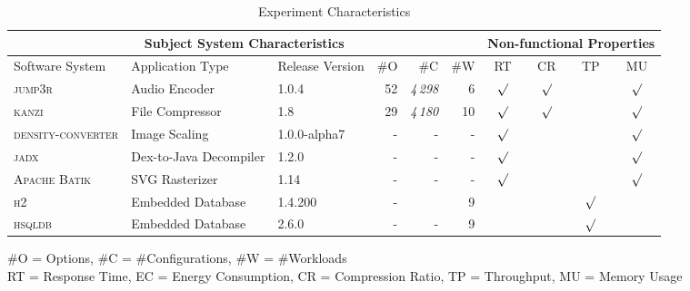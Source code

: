 
\begin{table*}
	\centering
	\caption{Experiment Characteristics}
	\begin{tabular}{lllrrr|cccc}
		\toprule
		\multicolumn{6}{c}{\textbf{Subject System Characteristics}} & \multicolumn{4}{c}{\textbf{Non-functional Properties}}\\
		\midrule
		Software System &  Application Type & Release Version & \#O & \#C & \#W & RT & CR & TP & MU \\
		\midrule
		\rowcolor{MidnightBlue!0}
		\textsc{jump3r} & Audio Encoder & 1.0.4 & 52 & \textit{4\,298} & 6 & $\surd$ & $\surd$ &  & $\surd$\\
		
		\rowcolor{MidnightBlue!0}	
		\textsc{kanzi} & File Compressor & 1.8 & 29 & \textit{4\,180} & 10 & $\surd$ & $\surd$ &  & $\surd$ \\
		
		\rowcolor{MidnightBlue!0}
		\textsc{density-converter} & Image Scaling & 1.0.0-alpha7 & - & - & - & $\surd$  &  &  & $\surd$ \\
		
		\rowcolor{MidnightBlue!0}
		\textsc{jadx} & Dex-to-Java Decompiler & 1.2.0 & - & - & - & $\surd$ &  &  & $\surd$ \\
		
		\rowcolor{MidnightBlue!0}
		\textsc{Apache Batik} & SVG Rasterizer & 1.14 & - & - &  - & $\surd$ &   &  & $\surd$ \\
		
		\rowcolor{MidnightBlue!0}	
		\textsc{h2} & Embedded Database & 1.4.200 & - &  & 9 &   &  & $\surd$ & \\
		
		\rowcolor{MidnightBlue!0}
		\textsc{hsqldb} & Embedded Database & 2.6.0 & - & - & 9  &  &  & $\surd$ & \\
		
		
		\bottomrule
	\end{tabular}
	
	\label{tab:subject_systems}
	{\vspace{1mm}\#O = Options, \#C = \#Configurations, \#W = \#Workloads}\\
	{RT = Response Time, EC = Energy Consumption, CR = Compression Ratio, TP = Throughput, MU = Memory Usage}
	\vspace{0.1cm}	
\end{table*}



